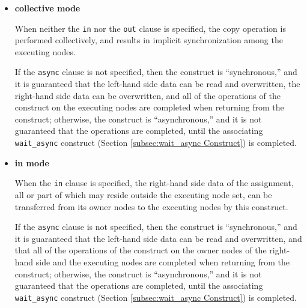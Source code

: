 \begin{itemize}
 \item {\bf collective mode}

       When neither the {\tt in} nor the {\tt out} clause is specified,
       the copy operation is performed collectively, and results in 
       implicit synchronization among the executing nodes.

       If the {\tt async} clause is not specified, then the construct is
       ``synchronous,'' and it is guaranteed that the left-hand side
       data can be read and overwritten, the right-hand side data can be
       overwritten, and all of 
       the operations of the construct on the executing nodes are
       completed when returning from the construct;
       otherwise, the construct is ``asynchronous,'' and it is not
       guaranteed that the operations are completed, until the
       associating {\tt wait\_async} construct (Section
       \ref{subsec:wait_async Construct}) is completed.

%
%

 \item {\bf in mode}

       When the {\tt in} clause is specified, the right-hand side data of the
       assignment, all or part of which may reside outside the
       executing node set, can be transferred from its owner nodes to
       the executing nodes by this construct.

       If the {\tt async} clause is not specified, then the construct is
       ``synchronous,'' and it is guaranteed that the left-hand side data
       can be read and overwritten, and that all of the operations of the
       construct on the owner nodes of the right-hand side and the executing nodes
       are completed when returning from the construct;
       otherwise, the construct is ``asynchronous,'' and it is not
       guaranteed that the operations are completed, until the
       associating {\tt wait\_async} construct (Section
       \ref{subsec:wait_async Construct}) is completed.


\end{itemize}
